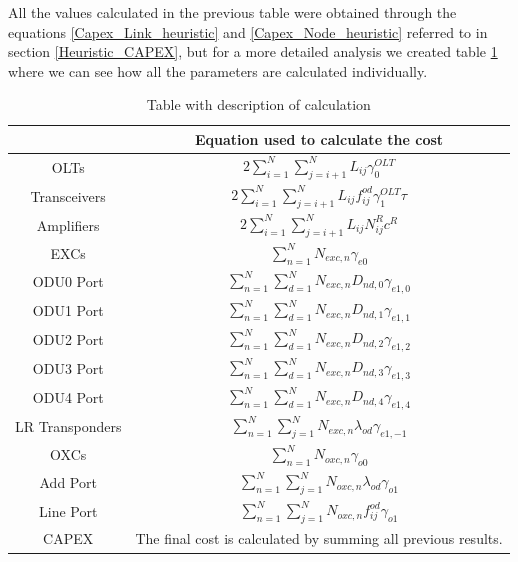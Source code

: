 \vspace{17pt}
All the values calculated in the previous table were obtained through the equations \ref{Capex_Link_heuristic} and \ref{Capex_Node_heuristic} referred to in section \ref{Heuristic_CAPEX}, but for a more detailed analysis we created table \ref{formulas_transl_heuristic} where we can see how all the parameters are calculated individually. \\

\begin{table}[h!]
\centering
\begin{tabular}{|| c | c ||}
 \hline
  & Equation used to calculate the cost \\ \hline
 OLTs & \(\displaystyle 2 \sum_{i=1}^{N}\sum_{j=i+1}^{N} L_{ij} \gamma_0^{OLT} \) \\ \hline
 Transceivers & \(\displaystyle 2 \sum_{i=1}^{N}\sum_{j=i+1}^{N} L_{ij} f_{ij}^{od} \gamma_1^{OLT} \tau \) \\ \hline
 Amplifiers & \(\displaystyle 2 \sum_{i=1}^{N}\sum_{j=i+1}^{N} L_{ij} N^R_{ij} c^R \) \\ \hline
 EXCs & \(\displaystyle \sum_{n=1}^N N_{exc,n} \gamma_{e0} \) \\ \hline
 ODU0 Port & \(\displaystyle \sum_{n=1}^{N} \sum_{d=1}^{N} N_{exc,n} D_{nd,0} \gamma_{e1,0} \) \\ \hline
 ODU1 Port & \(\displaystyle \sum_{n=1}^{N} \sum_{d=1}^{N} N_{exc,n} D_{nd,1} \gamma_{e1,1} \) \\ \hline
 ODU2 Port & \(\displaystyle \sum_{n=1}^{N} \sum_{d=1}^{N} N_{exc,n} D_{nd,2} \gamma_{e1,2} \)\\ \hline
 ODU3 Port & \(\displaystyle \sum_{n=1}^{N} \sum_{d=1}^{N} N_{exc,n} D_{nd,3} \gamma_{e1,3} \) \\ \hline
 ODU4 Port & \(\displaystyle \sum_{n=1}^{N} \sum_{d=1}^{N} N_{exc,n} D_{nd,4} \gamma_{e1,4} \) \\ \hline
 LR Transponders & \(\displaystyle \sum_{n=1}^{N} \sum_{j=1}^{N} N_{exc,n} \lambda_{od} \gamma_{e1,-1} \) \\ \hline
 OXCs & \(\displaystyle \sum_{n=1}^N N_{oxc,n} \gamma_{o0} \) \\ \hline
 Add Port & \(\displaystyle \sum_{n=1}^{N} \sum_{j=1}^{N} N_{oxc,n} \lambda_{od} \gamma_{o1} \) \\ \hline
 Line Port & \(\displaystyle \sum_{n=1}^{N} \sum_{j=1}^{N} N_{oxc,n} f_{ij}^{od} \gamma_{o1} \) \\ \hline
 CAPEX & The final cost is calculated by summing all previous results. \\
 \hline
 \end{tabular}
\caption{Table with description of calculation}
\label{formulas_transl_heuristic}
\end{table}

